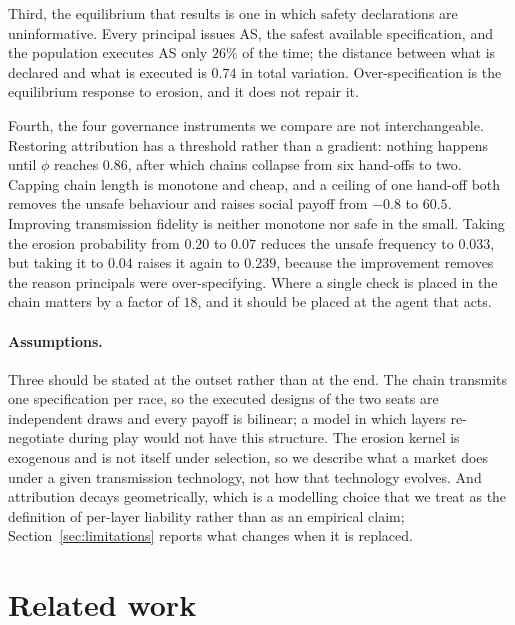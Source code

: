 \documentclass[11pt,a4paper]{article}
\theoremstyle{definition}
\newcommand{\AS}{\textsf{AS}}
\begin{document}
Third, the equilibrium that results is one in which safety declarations are
uninformative. Every principal issues \AS{}, the safest available
specification, and the population executes \AS{} only $26\%$ of the time; the
distance between what is declared and what is executed is $0.74$ in total
variation. Over-specification is the equilibrium response to erosion, and it
does not repair it.

Fourth, the four governance instruments we compare are not
interchangeable. Restoring attribution has a threshold rather than a gradient:
nothing happens until $\phi$ reaches $0.86$, after which chains collapse from
six hand-offs to two. Capping chain length is monotone and cheap, and a ceiling
of one hand-off both removes the unsafe behaviour and raises social payoff from
$-0.8$ to $60.5$. Improving transmission fidelity is neither monotone nor safe in the small.
Taking the erosion probability from $0.20$ to $0.07$ reduces the unsafe
frequency to $0.033$, but taking it to $0.04$ raises it again to $0.239$,
because the improvement removes the reason principals were over-specifying. Where a single check is placed in the chain matters by a
factor of $18$, and it should be placed at the agent that acts.

\paragraph{Assumptions.}
Three should be stated at the outset rather than at the end. The chain
transmits one specification per race, so the executed designs of the two seats
are independent draws and every payoff is bilinear; a model in which layers
re-negotiate during play would not have this structure. The erosion kernel is
exogenous and is not itself under selection, so we describe what a market does
under a given transmission technology, not how that technology evolves. And
attribution decays geometrically, which is a modelling choice that we treat as
the definition of per-layer liability rather than as an empirical claim;
Section~\ref{sec:limitations} reports what changes when it is replaced.

\section{Related work}
\label{sec:related}
\end{document}
